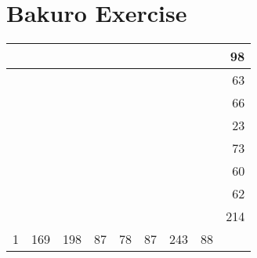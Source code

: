 \documentclass[]{article}
\begin{document}
\section{Bakuro Exercise}\begin{tabular}{rrrrrrrrr}
\hline
   &     &     &    &    &    &     &    &  98 \\ \hline
   &     &     &    &    &    &     &    &  63 \\ \hline
   &     &     &    &    &    &     &    &  66 \\ \hline
   &     &     &    &    &    &     &    &  23 \\ \hline
   &     &     &    &    &    &     &    &  73 \\ \hline
   &     &     &    &    &    &     &    &  60 \\ \hline
   &     &     &    &    &    &     &    &  62 \\ \hline
   &     &     &    &    &    &     &    & 214 \\ \hline
 1 & 169 & 198 & 87 & 78 & 87 & 243 & 88 &     \\ \hline
\hline
\end{tabular}\newpage 
\end{document}
